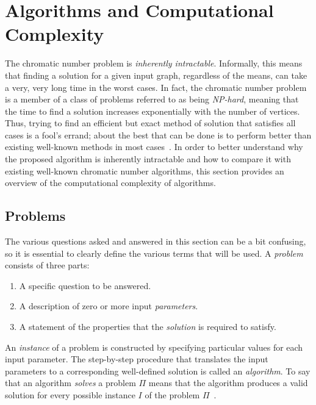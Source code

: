 \section{Algorithms and Computational Complexity}\label{sec:complexity}

The chromatic number problem is \emph{inherently intractable}.  Informally, this means that finding a solution for
a given input graph, regardless of the means, can take a very, very long time in the worst cases.  In fact, the
chromatic number problem is a member of a class of problems referred to as being \emph{NP-hard}, meaning that the
time to find a solution increases exponentially with the number of vertices.  Thus, trying to find an efficient but
exact method of solution that satisfies all cases is a fool's errand; about the best that can be done is to perform
better than existing well-known methods in most cases~\cite{garey}.  In order to better understand why the proposed
algorithm is inherently intractable and how to compare it with existing well-known chromatic number algorithms,
this section provides an overview of the computational complexity of algorithms.

\subsection{Problems}\label{sec:sub:problems}

The various questions asked and answered in this section can be a bit confusing, so it is essential to clearly
define the various terms that will be used.  A \emph{problem} consists of three parts:

\begin{enumerate}
\item A specific question to be answered.
\item A description of zero or more input \emph{parameters}.
\item A statement of the properties that the \emph{solution} is required to satisfy.
\end{enumerate}

An \emph{instance} of a problem is constructed by specifying particular values for each input parameter.  The
step-by-step procedure that translates the input parameters to a corresponding well-defined solution is called an
\emph{algorithm}.  To say that an algorithm \emph{solves} a problem \(\Pi\) means that the algorithm produces a
valid solution for every possible instance \(I\) of the problem \(\Pi\)~\cite{garey}.

